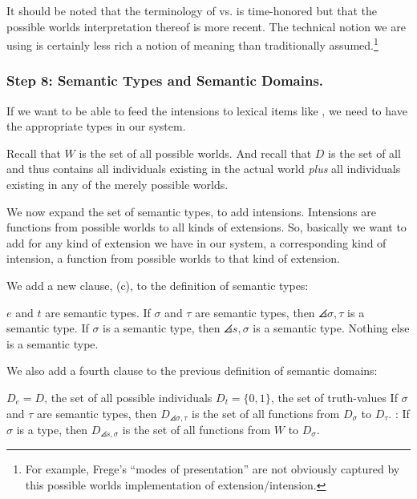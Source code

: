 It %
%
should be noted that the terminology of  vs.  is
time-honored but that the possible worlds interpretation thereof is more recent.
The technical notion we are using is certainly less rich a notion of meaning
than traditionally assumed.\footnote{For example, Frege's ``modes of
  presentation'' are not obviously captured by this possible worlds
  implementation of extension/intension.}

\subsubsection{Step 8: Semantic Types and Semantic Domains.} \label{sec:semantic-types}

If we want to be able to feed the intensions to lexical items like
, we need to have the appropriate
types in our system.

Recall that $W$ is the set of all possible worlds. And recall that $D$ is the
set of all  and thus contains all individuals
existing in the actual world \emph{plus} all individuals existing in any of the
merely possible worlds.

We now expand the set of semantic types, to add intensions. Intensions are
functions from possible worlds to all kinds of extensions. So, basically we want
to add for any kind of extension we have in our system, a corresponding kind of
intension, a function from possible worlds to that kind of extension.

We add a new clause, (\nextx c), to the definition of semantic types:

\pex {}
\a $e$ and $t$ are semantic types.
\a If $\sigma$ and $\tau$ are semantic types, then $\angles{\sigma,\tau}$ is a semantic type.
\a If $\sigma$ is a semantic type, then $\angles{s,\sigma}$ is a semantic type.
\a Nothing else is a semantic type.
\xe

We also add a fourth clause to the previous definition of semantic domains:

\pex {}
\a $D_{e} = D$, the set of all possible
individuals
\a $D_{t} = \{0,1\}$, the set of truth-values
\a If $\sigma$ and
$\tau$ are semantic types, then $D_{\angles{\sigma,\tau}}$ is the set of all
functions from $D_{\sigma}$ to $D_{\tau}$.
\a {}: If $\sigma$ is
a type, then $D_{\angles{s,\sigma}}$ is the set of all functions from $W$ to
$D_{\sigma}$.
\xe

